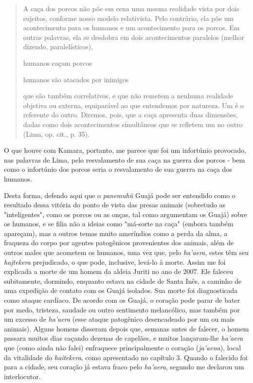 \begin{quote}
A caça dos porcos não põe em cena uma mesma realidade vista por dois
sujeitos, conforme nosso modelo relativista. Pelo contrário, ela põe um
acontecimento para os humanos e um acontecimento para os porcos. Em
outras palavras, ela se desdobra em dois acontecimentos paralelos
(melhor dizendo, paralelísticos),

humanos caçam porcos

humanos são atacados por inimigos

que são também correlativos, e que não remetem a nenhuma realidade
objetiva ou externa, equiparável ao que entendemos por natureza. Um é o
referente do outro. Diremos, pois, que a caça apresenta duas dimensões,
dadas como dois acontecimentos simultâneos que se refletem um no outro
(Lima, op. cit., p. 35).
\end{quote}

O que houve com Kamara, portanto, me parece que foi um infortúnio
provocado, nas palavras de Lima, pelo resvalamento de sua caça na guerra
dos porcos - bem como o infortúnio dos porcos seria o resvalamento de
sua guerra na caça dos humanos.

Desta forma, defendo aqui que o \emph{panemuhũ} Guajá pode ser entendido
como o resultado dessa vitória do ponto de vista das presas animais
(sobretudo as "inteligentes", como os porcos ou as onças, tal como
argumentam os Guajá) sobre os humanos, e se filia não a ideias como
"má-sorte na caça" (embora também apareçam), mas a outros temas muito
ameríndios como a perda da alma, a fraqueza do corpo por agentes
patogênicos provenientes dos animais, além de outros males que acometem
os humanos, uma vez que, pelo \emph{ha'aera}, estes têm seu
\emph{hajtekera} prejudicado, o que pode, inclusive, levá-lo à morte.
Assim me foi explicada a morte de um homem da aldeia Juriti no ano de
2007. Ele faleceu subitamente, dormindo, enquanto estava na cidade de
Santa Inês, a caminho de uma expedição de contato com os Guajá isolados.
Sua morte foi diagnosticada como ataque cardíaco. De acordo com os
Guajá, o coração pode parar de bater por medo, tristeza, saudade ou
outro sentimento melancólico, mas também por um excesso de
\emph{ha'aera} (esse ataque patogênico desencadeado por um ou mais
animais). Alguns homens disseram depois que, semanas antes de falecer, o
homem passara muitos dias caçando dezenas de capelães, e muitos
lançaram-lhe \emph{ha'aera} que (como ainda não falei) enfraquece
principalmente o coração (\emph{ja'aena}), local da vitalidade do
\emph{haitekera}, como apresentado no capítulo 3. Quando o falecido foi
para a cidade, seu coração já estava fraco pelo \emph{ha'aera}, segundo
me declarou um interlocutor.


